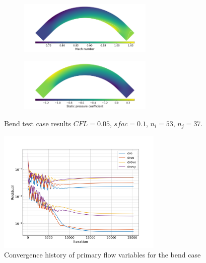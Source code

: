 \documentclass{article}
\begin{document}
\begin{figure}[H]
    \centering
    \begin{subfigure}{0.99\textwidth}
        \centering
        \includegraphics[width=0.7\textwidth]{figures/bend_mach.png}
        \caption{}
        \label{fig:bend_mach}
    \end{subfigure}
    \begin{subfigure}{0.99\textwidth}
        \centering
        \includegraphics[width=0.7\textwidth]{figures/bend_cp.png}
        \caption{}
        \label{fig:bend_cp}
    \end{subfigure}
    \caption{Bend test case results $CFL = 0.05$, $sfac = 0.1$, $n_i = 53$, $n_j = 37$.}
\end{figure}

\begin{figure}[H]
    \centering
    \includegraphics[width=0.7\textwidth]{figures/bend_conv.png}
    \caption{Convergence history of primary flow variables for the bend case}
    \label{fig:bend_conv}
\end{figure}
\end{document}
